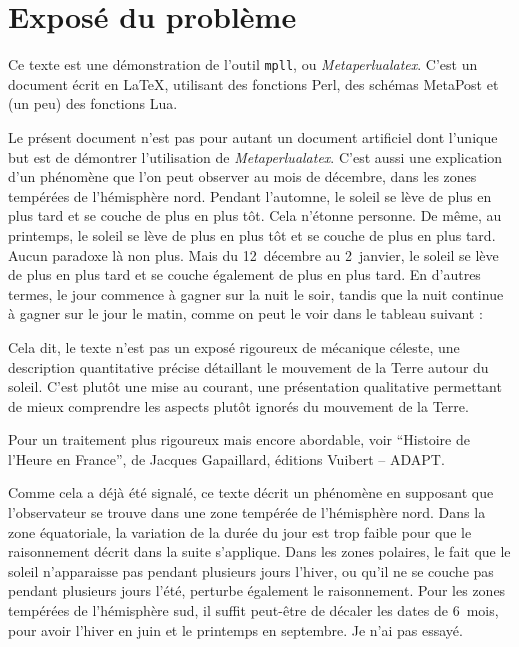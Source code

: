\documentclass[a4paper]{article}
\newenvironment{texte}{\rmfamily}{}
\newcommand{\fran}[0]{\selectlanguage{french}}
\begin{document}
\begin{texte}

\fran

\section{Exposé du problème}

Ce texte est une démonstration de l'outil \texttt{mpll}, ou 
\textit{Metaperlualatex}. C'est un document écrit en \LaTeX,
utilisant des fonctions Perl, des schémas MetaPost et (un peu)
des fonctions Lua.

Le présent document n'est pas pour autant un document artificiel
dont l'unique but est de démontrer l'utilisation de \textit{Metaperlualatex}.
C'est aussi une explication d'un phénomène que l'on peut observer au mois
de décembre, dans les zones tempérées de l'hémisphère nord. Pendant l'automne,
le soleil se lève de plus en plus tard et se couche de plus en
plus tôt. Cela n'étonne personne. De même, au printemps, le
soleil se lève de plus en plus tôt et se couche de plus
en plus tard. Aucun paradoxe là non plus.
Mais du 12~décembre au 2~janvier,
le soleil se lève de plus en plus tard et se couche
également de plus en plus tard. En d'autres termes,
le jour commence à gagner sur la nuit le
soir, tandis que la nuit continue à gagner sur le jour le matin,
comme on peut le voir dans le tableau suivant :

\vspace{2mm}
\vspace{2mm}

Cela dit, le texte n'est pas un exposé rigoureux de mécanique céleste,
une description quantitative précise détaillant le mouvement de la
Terre autour du soleil. C'est plutôt une mise au courant, une
présentation qualitative permettant de mieux comprendre les aspects
plutôt ignorés du mouvement de la Terre.

Pour un traitement plus rigoureux mais encore abordable, voir
``Histoire de l'Heure en France'', de Jacques Gapaillard, éditions
Vuibert -- ADAPT.

Comme cela a déjà été signalé, ce texte décrit un phénomène en supposant
que l'observateur se trouve dans une zone tempérée de l'hémisphère nord.
Dans la zone équatoriale, la variation de la durée du jour est trop faible
pour que le raisonnement décrit dans la suite s'applique. Dans les zones
polaires, le fait que le soleil n'apparaisse pas pendant plusieurs jours
l'hiver, ou qu'il ne se couche pas pendant plusieurs jours l'été, perturbe
également le raisonnement. Pour les zones tempérées de l'hémisphère sud,
il suffit peut-être de décaler les dates de 6~mois, pour avoir l'hiver
en juin et le printemps en septembre. Je n'ai pas essayé.


\end{texte}
\end{document}
